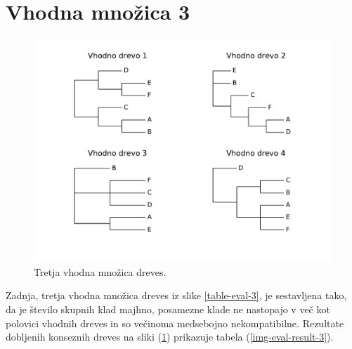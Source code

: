 \documentclass[a4paper, 12pt]{book}
\begin{document}
\section{Vhodna množica 3}
\begin{figure}[h!]
	\begin{center}
		\includegraphics[scale=0.63, clip=true, trim=0 2cm 0 0.5cm]{gfx/eval_input_3.pdf}
	\end{center}
	\caption{Tretja vhodna množica dreves.}
	\label{img-eval-input-3}
\end{figure}

Zadnja, tretja vhodna množica dreves iz slike \ref{table-eval-3}, je sestavljena tako, da je število skupnih klad majhno, posamezne klade ne nastopajo v več kot polovici vhodnih dreves in so večinoma medsebojno nekompatibilne. Rezultate dobljenih konseznih dreves na sliki (\ref{img-eval-input-3}) prikazuje tabela (\ref{img-eval-result-3}).
\end{document}
